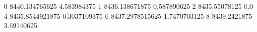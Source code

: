 0 8440.134765625 4.583984375
1 8436.138671875 0.587890625
2 8435.55078125 0.0
4 8435.8544921875 0.3037109375
6 8437.2978515625 1.7470703125
8 8439.2421875 3.69140625
